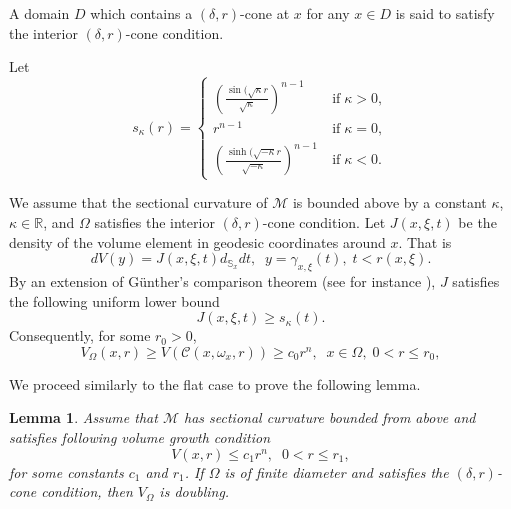 \documentclass[10pt]{amsart}
\newtheorem{lemma}[theorem]{Lemma}
\theoremstyle{definition}
\begin{document}
\smallskip
A domain $D$ which contains a $(\delta ,r)$-cone at $x$ for any $x \in D$ is said to satisfy
the interior $(\delta ,r)$-cone condition.

\smallskip
Let
\[
s_\kappa (r)=\left\{
\begin{array}{ll}
\left(\frac{\sin (\sqrt{\kappa}r}{\sqrt{\kappa}}\right)^{n-1}\;\; &\textrm{if}\; \kappa >0,
\\
r^{n-1} &\textrm{if}\; \kappa =0,
\\
\left(\frac{\sinh (\sqrt{-\kappa}r}{\sqrt{-\kappa}}\right)^{n-1}\  &\textrm{if}\; \kappa <0.
\end{array}
\right.
\]

\smallskip
We  assume that the sectional curvature of $\mathcal{M}$ is bounded above by a constant $\kappa$, $\kappa \in \mathbb{R}$,  and $\Omega$  satisfies the interior $(\delta ,r)$-cone condition. Let $J(x,\xi ,t)$ be the density of the volume element in geodesic coordinates around $x$. That is
\[
dV(y)=J(x,\xi ,t)d_{\mathbb{S}_x}dt,\;\; y=\gamma _{x,\xi}(t),\; t<r(x,\xi ).
\]
By an extension of G\"unther's comparison theorem (see for instance \cite{KK}),  $J$ satisfies the following uniform lower bound
\[
J(x,\xi ,t)\geq s_\kappa (t).
\]
Consequently, for some $r_0>0$,
\begin{equation}\label{ce}
V_\Omega (x,r)\geq V (\mathscr{C}(x,\omega _x,r))\geq c_0 r^n,\;\; x\in \Omega ,\; 0<r\leq r_0 ,
\end{equation}

We proceed similarly to the flat case  to prove the following lemma.

\begin{lemma}\label{lemEx2}
Assume that $\mathcal{M}$ has sectional curvature bounded from above  and satisfies 
following volume growth condition 
\[
V(x,r)\leq c_1r^n, \;\; 0<r\leq r_1,
\]
for some constants $c_1$ and $r_1$. If $\Omega$ is  of finite diameter and satisfies the $(\delta ,r)$-cone condition, then $V_\Omega$ is doubling.
\end{lemma}
\end{document}
